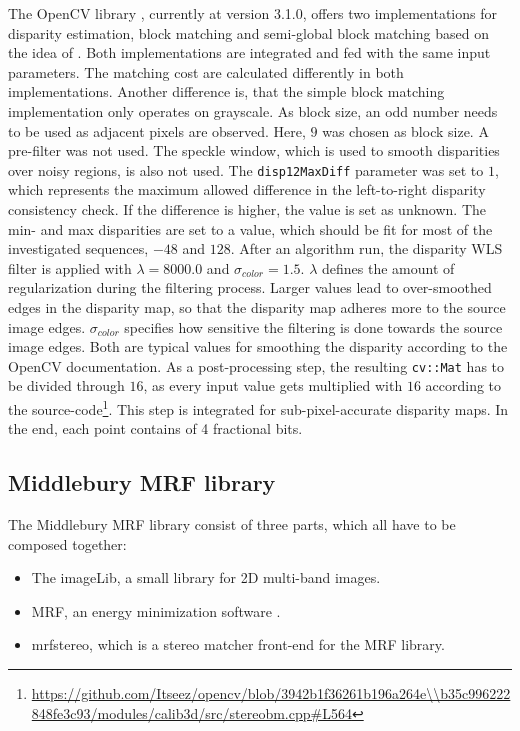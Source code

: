 The OpenCV library \citep{opencv_library}, currently at version 3.1.0, offers two implementations for disparity estimation, block matching and semi-global block matching based on the idea of \citeauthor{hirschmuller2005accurate} \citep{hirschmuller2005accurate}.
Both implementations are integrated and fed with the same input parameters.
The matching cost are calculated differently in both implementations.
Another difference is, that the simple block matching implementation only operates on grayscale.
As block size, an odd number needs to be used as adjacent pixels are observed.
Here, $9$ was chosen as block size.
A pre-filter was not used.
The speckle window, which is used to smooth disparities over noisy regions, is also not used.
The \texttt{disp12MaxDiff} parameter was set to $1$, which represents the maximum allowed difference in the left-to-right disparity consistency check.
If the difference is higher, the value is set as unknown.
The min- and max disparities are set to a value, which should be fit for most of the investigated sequences, $-48$ and $128$.
\newline\newline\noindent After an algorithm run, the disparity WLS filter is applied with $\lambda = 8000.0$ and $\sigma_{color} = 1.5$.
$\lambda$ defines the amount of regularization during the filtering process.
Larger values lead to over-smoothed edges in the disparity map, so that the disparity map adheres more to the source image edges.
$\sigma_{color}$ specifies how sensitive the filtering is done towards the source image edges.
Both are typical values for smoothing the disparity according to the OpenCV documentation.
As a post-processing step, the resulting \texttt{cv::Mat} has to be divided through $16$, as every input value gets multiplied with $16$ according to the source-code\footnote{\url{https://github.com/Itseez/opencv/blob/3942b1f36261b196a264e\\b35c996222848fe3c93/modules/calib3d/src/stereobm.cpp\#L564}}.
This step is integrated for sub-pixel-accurate disparity maps.
In the end, each point contains of 4 fractional bits.

\subsection*{Middlebury MRF library}

The Middlebury MRF library \citep{scharstein2006middlebury} consist of three parts, which all have to be composed together:
\begin{itemize}
  \item The imageLib, a small library for 2D multi-band images.
  \item MRF, an energy minimization software \citep{szeliski2008comparative}.
  \item mrfstereo, which is a stereo matcher front-end for the MRF library.
\end{itemize}


